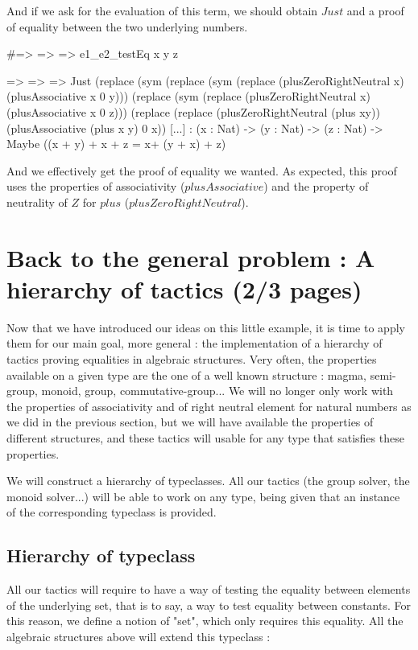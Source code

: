 \documentclass{sigplanconf}
\begin{document}
And if we ask for the evaluation of this term, we should obtain $Just$ and a proof of equality between the two underlying numbers.
\begin{code}[caption=Obtained proof, captionpos=b, label=lst1:haskell2]
#\x => \y => \z => e1_e2_testEq x y z

\x => \y => \z => Just (replace (sym (replace 
  (sym (replace (plusZeroRightNeutral x) 
  (plusAssociative x 0 y))) (replace 
  (sym (replace (plusZeroRightNeutral x) 
  (plusAssociative x 0 z))) (replace (replace 
  (plusZeroRightNeutral (plus xy)) 
  (plusAssociative (plus x y) 0 x)) [...]
: (x : Nat) -> (y : Nat) -> (z : Nat) 
  -> Maybe ((x + y) + x + z 
            = x+ (y + x) + z)
\end{code}

And we effectively get the proof of equality we wanted. As expected, this proof uses the properties of associativity ($plusAssociative$) and the property of neutrality of $Z$ for $plus$ ($plusZeroRightNeutral$).

\section {Back to the general problem : A hierarchy of tactics (2/3 pages)}

Now that we have introduced our ideas on this little example, it is time to apply them for our main goal, more general : the implementation of a hierarchy of tactics proving equalities in algebraic structures. Very often, the properties available on a given type are the one of a well known structure : magma, semi-group, monoid, group, commutative-group...  We will no longer only work with the properties of associativity and of right neutral element for natural numbers as we did in the previous section, but we will have available the properties of different structures, and these tactics will usable for any type that satisfies these properties.

We will construct a hierarchy of typeclasses. All our tactics (the group solver, the monoid solver...) will be able to work on any type, being given that an instance of the corresponding typeclass is provided.

\subsection {Hierarchy of typeclass}

All our tactics will require to have a way of testing the equality between elements of the underlying set, that is to say, a way to test equality between constants. For this reason, we define a notion of "set", which only requires this equality. All the algebraic structures above will extend this typeclass :
\end{document}
